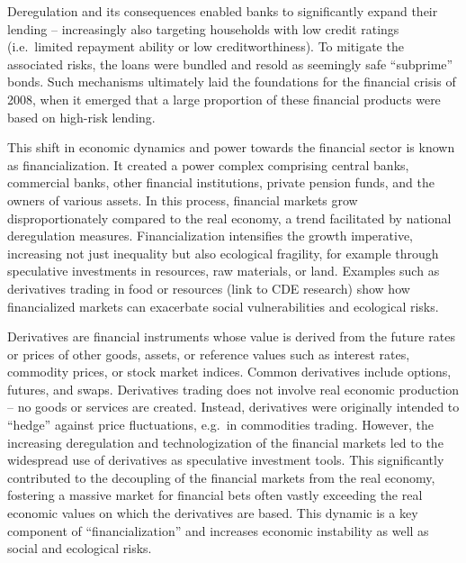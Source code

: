 \documentclass[
  a4paper,
  openany]{book}
\begin{document}
Deregulation and its consequences enabled banks to significantly expand
their lending -- increasingly also targeting households with low credit
ratings (i.e.~limited repayment ability or low creditworthiness). To
mitigate the associated risks, the loans were bundled and resold as
seemingly safe ``subprime'' bonds. Such mechanisms ultimately laid the
foundations for the financial crisis of 2008, when it emerged that a
large proportion of these financial products were based on high-risk
lending.

This shift in economic dynamics and power towards the financial sector
is known as financialization. It created a power complex comprising
central banks, commercial banks, other financial institutions, private
pension funds, and the owners of various assets. In this process,
financial markets grow disproportionately compared to the real economy,
a trend facilitated by national deregulation measures. Financialization
intensifies the growth imperative, increasing not just inequality but
also ecological fragility, for example through speculative investments
in resources, raw materials, or land. Examples such as derivatives
trading in food or resources (link to CDE research) show how
financialized markets can exacerbate social vulnerabilities and
ecological risks.

\begin{tcolorbox}[enhanced jigsaw, left=2mm, arc=.35mm, titlerule=0mm, opacityback=0, leftrule=.75mm, title={What are derivatives and how do they contribute to financialization?}, breakable, bottomtitle=1mm, rightrule=.15mm, coltitle=black, toptitle=1mm, bottomrule=.15mm, colback=white, opacitybacktitle=0.6, colbacktitle=quarto-callout-note-color!10!white, toprule=.15mm, colframe=quarto-callout-note-color-frame]

Derivatives are financial instruments whose value is derived from the
future rates or prices of other goods, assets, or reference values such
as interest rates, commodity prices, or stock market indices. Common
derivatives include options, futures, and swaps. Derivatives trading
does not involve real economic production -- no goods or services are
created. Instead, derivatives were originally intended to ``hedge''
against price fluctuations, e.g.~in commodities trading. However, the
increasing deregulation and technologization of the financial markets
led to the widespread use of derivatives as speculative investment
tools. This significantly contributed to the decoupling of the financial
markets from the real economy, fostering a massive market for financial
bets often vastly exceeding the real economic values on which the
derivatives are based. This dynamic is a key component of
``financialization'' and increases economic instability as well as
social and ecological risks.

\end{tcolorbox}
\end{document}
